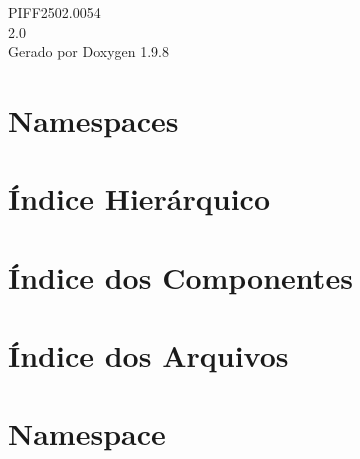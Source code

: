 \documentclass[twoside]{book}
\newcommand{\+}{\discretionary{\mbox{\scriptsize$\hookleftarrow$}}{}{}}
\newcommand{\clearemptydoublepage}{%
    \newpage{\pagestyle{empty}\cleardoublepage}%
  }
\begin{document}
  \raggedbottom
    \hypersetup{pageanchor=false,
                bookmarksnumbered=true,
                pdfencoding=unicode
               }
  \begin{titlepage}
  \vspace*{7cm}
  \begin{center}%
  {\Large PIFF2502.\+0054}\\
  [1ex]\large 2.\+0 \\
  \vspace*{1cm}
  {\large Gerado por Doxygen 1.9.8}\\
  \end{center}
  \end{titlepage}
  \clearemptydoublepage
  \tableofcontents
  \clearemptydoublepage
  \hypersetup{pageanchor=true}




\chapter{Namespaces}

\chapter{Índice Hierárquico}

\chapter{Índice dos Componentes}

\chapter{Índice dos Arquivos}

\chapter{Namespace}

























\end{document}
